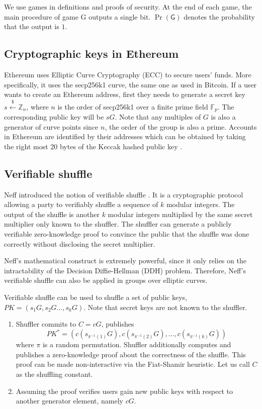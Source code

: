 \documentclass[a4paper]{article}
\theoremstyle{definition}
\begin{document}
We use games in definitions and proofs of security. At the end of each game, the main procedure of game \textsf{G} outputs a single bit. $\Pr(\textsf{G})$ denotes the probability that the output is $1$.
\subsection{Cryptographic keys in Ethereum}
Ethereum uses Elliptic Curve Cryptography (ECC) to secure users' funds. More specifically, it uses the secp256k1 curve, the same one as used in Bitcoin. If a user wants to create an Ethereum address, first they needs to generate a secret key  $s\stackrel{\$}{\leftarrow}\mathbb{Z}_n$, where $n$ is the order of secp256k1 over a finite prime field $\mathbb{F}_{p}$. The corresponding public key will be $sG$. Note that any multiples of $G$ is also a generator of curve points since $n$, the order of the group is also a prime. Accounts in Ethereum are identified by their addresses which can be obtained by taking the right most 20 bytes of the Keccak hashed public key \cite{wood2014ethereum}. 
    
\subsection{Verifiable shuffle}

Neff introduced the notion of verifiable shuffle \cite{neff2001verifiable}. It is a cryptographic protocol allowing a party to verifiably shuffle a sequence of $k$ modular integers. The output of the shuffle is another $k$ modular integers multiplied by the same secret multiplier only known to the shuffler. The shuffler can generate a publicly verifiable zero-knowledge proof to convince the public that the shuffle was done correctly without disclosing the secret multiplier. 

Neff's mathematical construct is extremely powerful, since it only relies on the intractability of the Decision Diffie-Hellman (DDH) problem. Therefore, Neff's verifiable shuffle can also be applied in groups over elliptic curves.

Verifiable shuffle can be used to shuffle a set of public keys, $PK=(s_{1}G,s_{2}G\dots,s_{k}G)$. Note that secret keys are not known to the shuffler.

\begin{enumerate}
	\item Shuffler commits to $C=cG$, publishes $$PK^*=(c(s_{\pi^{-1}(1)}G),c(s_{\pi^{-1}(2)}G),\dots,c({s_{\pi^{-1}(k)}}G))$$ where $\pi$ is a random permutation. Shuffler additionally computes and publishes a zero-knowledge proof about the correctness of the shuffle. This proof can be made non-interactive via the Fiat-Shamir heuristic. Let us call $C$ as the shuffling constant.
	\item Assuming the proof verifies users gain new public keys with respect to another generator element, namely $cG$.
\end{enumerate}
\end{document}
